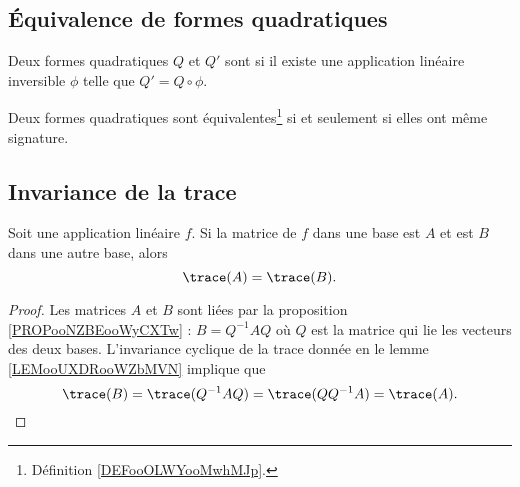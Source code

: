 \subsection{Équivalence de formes quadratiques}

\begin{definition}        \label{DEFooOLWYooMwhMJp}
    Deux formes quadratiques $Q$ et $Q'$ sont  si il existe une application linéaire inversible \( \phi\) telle que \( Q'=Q\circ \phi\).
\end{definition}

\begin{proposition}       \label{PROPooBWXMooLsgyKm}
    Deux formes quadratiques sont équivalentes\footnote{Définition \ref{DEFooOLWYooMwhMJp}.} si et seulement si elles ont même signature.
\end{proposition}


\subsection{Invariance de la trace}

\begin{proposition}      \label{PROPooRMYQooWkEpJJ}
    Soit une application linéaire \( f\). Si la matrice de \( f\) dans une base est \( A\) et est \( B\) dans une autre base, alors
    \begin{equation}
        \trace(A)=\trace(B).
    \end{equation}
\end{proposition}

\begin{proof}
    Les matrices \( A\) et \( B\) sont liées par la proposition \ref{PROPooNZBEooWyCXTw} : \( B=Q^{-1}AQ\) où \( Q\) est la matrice qui lie les vecteurs des deux bases. L'invariance cyclique de la trace donnée en le lemme \ref{LEMooUXDRooWZbMVN} implique que
    \begin{equation}
        \trace(B)=\trace(Q^{-1}AQ)=\trace(QQ^{-1}A)=\trace(A).
    \end{equation}
\end{proof}

